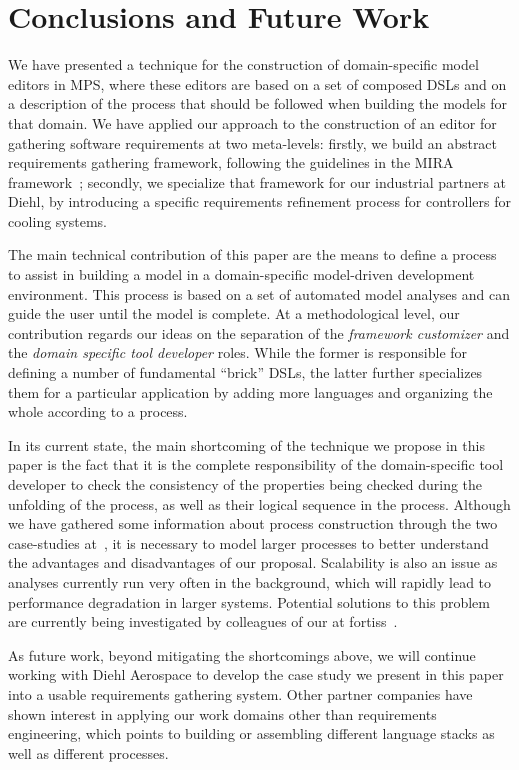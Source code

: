 \section{Conclusions and Future Work}
\label{sec:conclusion}
 \vspace{-.4cm}
We have presented a technique for the construction of
domain-specific model editors in MPS, where these editors are based on
a set of composed DSLs and on a description of the process that
should be followed when building the models for that domain. We have applied our
approach to the construction of an editor for gathering software requirements
at two meta-levels: firstly, we build an abstract requirements gathering
framework, following the guidelines in the MIRA framework~\cite{MIRA13}; secondly, we
specialize that framework for our industrial partners at Diehl, by introducing
a specific requirements refinement process for controllers for cooling systems.

The main technical contribution of this paper are the means to define a process
to assist in building a model in a domain-specific model-driven development
environment. This process is based on a set of automated model analyses and can
guide the user until the model is complete.
At a methodological level, our contribution regards our ideas on the separation
of the \emph{framework customizer} and the  \emph{domain specific tool
developer} roles. While the former is responsible for defining a number of
fundamental ``brick'' DSLs, the latter further specializes them for a particular
application by adding more languages and organizing the whole according to a
process.

In its current state, the main shortcoming of the technique we propose in this
paper is the fact that it is the complete responsibility of the domain-specific
tool developer to check the consistency of the properties being checked during
the unfolding of the process, as well as their logical sequence in the process.
Although we have gathered some information about process construction through
the two case-studies
at~\cite{coolingControllerProcessVideo,earsctrlProcessVideo}, it is necessary to
model larger processes to better understand the advantages and disadvantages of
our proposal.  Scalability is also an issue as analyses currently
run very often in the background, which will rapidly lead to performance
degradation in larger systems. Potential solutions to this problem are currently
being investigated by colleagues of our at fortiss~\cite{Models17Sudeep}.

As future work, beyond mitigating the shortcomings above, we will continue
working with Diehl Aerospace to develop the case study we present in this paper
into a usable requirements gathering system. Other partner companies have shown
interest in applying our work domains other than requirements engineering, which
points to building or assembling different language stacks as well as different
processes.

